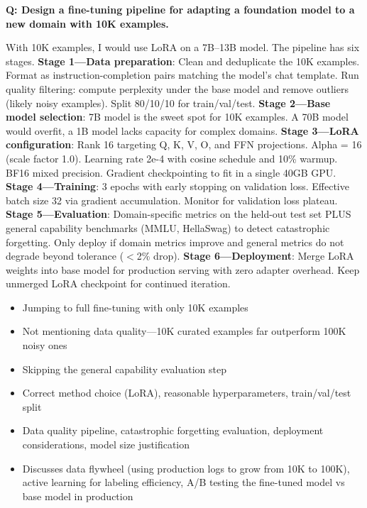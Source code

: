 \begin{interviewq}
\textbf{Q: Design a fine-tuning pipeline for adapting a foundation model to a new domain with 10K examples.}

 \quad {} \quad \badgefreq{\freqmed}

\stronganswer With 10K examples, I would use LoRA on a 7B--13B model. The pipeline has six stages. \textbf{Stage 1---Data preparation}: Clean and deduplicate the 10K examples. Format as instruction-completion pairs matching the model's chat template. Run quality filtering: compute perplexity under the base model and remove outliers (likely noisy examples). Split 80/10/10 for train/val/test. \textbf{Stage 2---Base model selection}: 7B model is the sweet spot for 10K examples. A 70B model would overfit, a 1B model lacks capacity for complex domains. \textbf{Stage 3---LoRA configuration}: Rank 16 targeting Q, K, V, O, and FFN projections. Alpha = 16 (scale factor 1.0). Learning rate 2e-4 with cosine schedule and 10\% warmup. BF16 mixed precision. Gradient checkpointing to fit in a single 40GB GPU. \textbf{Stage 4---Training}: 3 epochs with early stopping on validation loss. Effective batch size 32 via gradient accumulation. Monitor for validation loss plateau. \textbf{Stage 5---Evaluation}: Domain-specific metrics on the held-out test set PLUS general capability benchmarks (MMLU, HellaSwag) to detect catastrophic forgetting. Only deploy if domain metrics improve and general metrics do not degrade beyond tolerance ($<$2\% drop). \textbf{Stage 6---Deployment}: Merge LoRA weights into base model for production serving with zero adapter overhead. Keep unmerged LoRA checkpoint for continued iteration.

\redflags
\begin{itemize}
    \item Jumping to full fine-tuning with only 10K examples
    \item Not mentioning data quality---10K curated examples far outperform 100K noisy ones
    \item Skipping the general capability evaluation step
\end{itemize}


\goodgreat
\begin{itemize}
    \item {} Correct method choice (LoRA), reasonable hyperparameters, train/val/test split
    \item {} Data quality pipeline, catastrophic forgetting evaluation, deployment considerations, model size justification
    \item {} Discusses data flywheel (using production logs to grow from 10K to 100K), active learning for labeling efficiency, A/B testing the fine-tuned model vs base model in production
\end{itemize}


\end{interviewq}
